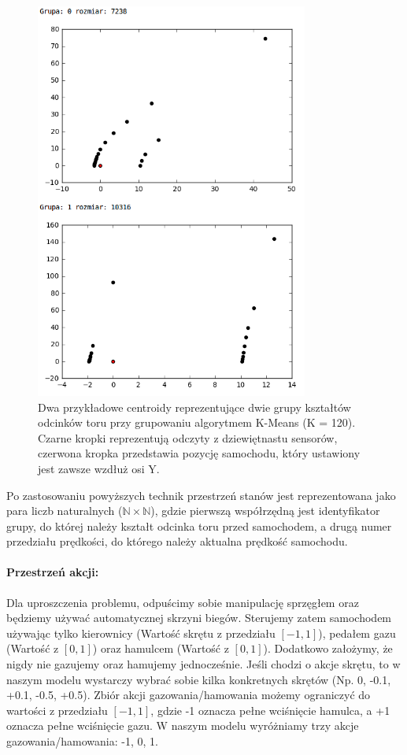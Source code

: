 \documentclass{article}
\begin{document}
\begin{figure}[H]
	\centering
    \includegraphics[width=0.8\textwidth]{exampleCentroids.png}
    \caption{Dwa przykładowe centroidy reprezentujące dwie grupy kształtów odcinków toru przy grupowaniu algorytmem K-Means (K = 120). Czarne kropki reprezentują odczyty z dziewiętnastu sensorów, czerwona kropka przedstawia pozycję samochodu, który ustawiony jest zawsze wzdłuż osi Y.}
\end{figure}

Po zastosowaniu powyższych technik przestrzeń stanów jest reprezentowana jako para liczb naturalnych ($\mathbb{N} \times \mathbb{N}$), gdzie pierwszą współrzędną jest identyfikator grupy, do której należy kształt odcinka toru przed samochodem, a drugą numer przedziału prędkości, do którego należy aktualna prędkość samochodu.

\paragraph{Przestrzeń akcji:}
Dla uproszczenia problemu, odpuścimy sobie manipulację sprzęgłem oraz będziemy używać automatycznej skrzyni biegów. Sterujemy zatem samochodem używając tylko kierownicy (Wartość skrętu z przedziału $[-1,1]$), pedałem gazu (Wartość z $[0,1]$) oraz hamulcem (Wartość z $[0,1]$). Dodatkowo założymy, że nigdy nie gazujemy oraz hamujemy jednocześnie. Jeśli chodzi o akcje skrętu, to w naszym modelu wystarczy wybrać sobie kilka konkretnych skrętów (Np. 0, -0.1, +0.1, -0.5, +0.5). Zbiór akcji gazowania/hamowania możemy ograniczyć do wartości z przedziału $[-1,1]$, gdzie -1 oznacza pełne wciśnięcie hamulca, a +1 oznacza pełne wciśnięcie gazu. W naszym modelu wyróżniamy trzy akcje gazowania/hamowania: -1, 0, 1.
\end{document}
